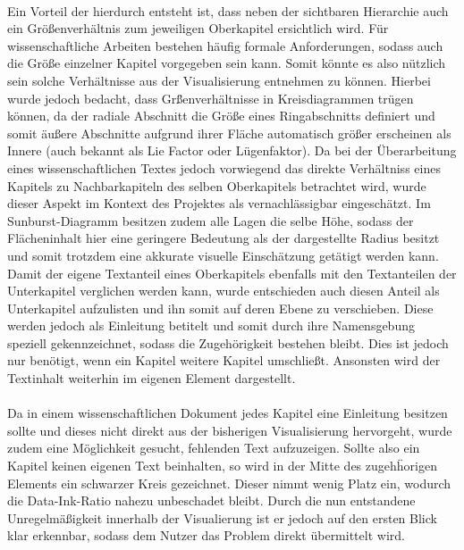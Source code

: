 \\
Ein Vorteil der hierdurch entsteht ist, dass neben der sichtbaren Hierarchie auch ein Gr\"o{\ss}enverh\"altnis zum jeweiligen Oberkapitel ersichtlich wird. F\"ur wissenschaftliche Arbeiten bestehen h\"aufig formale Anforderungen, sodass auch die Gr\"o{\ss}e einzelner Kapitel vorgegeben sein kann. Somit k\"onnte es also n\"utzlich sein solche Verh\"altnisse aus der Visualisierung entnehmen zu k\"onnen. Hierbei wurde jedoch bedacht, dass Gr\"{\ss}enverh\"altnisse in Kreisdiagrammen tr\"ugen k\"onnen, da der radiale Abschnitt die Gr\"o{\ss}e eines Ringabschnitts definiert und somit \"au{\ss}ere Abschnitte aufgrund ihrer Fl\"ache automatisch gr\"o{\ss}er erscheinen als Innere (auch bekannt als Lie Factor oder L\"ugenfaktor). Da bei der \"Uberarbeitung eines wissenschaftlichen Textes jedoch vorwiegend das direkte Verh\"altniss eines Kapitels zu Nachbarkapiteln des selben Oberkapitels betrachtet wird, wurde dieser Aspekt im Kontext des Projektes als vernachl\"assigbar eingesch\"atzt. Im Sunburst-Diagramm besitzen zudem alle Lagen die selbe H\"ohe, sodass der Fl\"acheninhalt hier eine geringere Bedeutung als der dargestellte Radius besitzt und somit trotzdem eine akkurate visuelle Einsch\"atzung get\"atigt werden kann. Damit der eigene Textanteil eines Oberkapitels ebenfalls mit den Textanteilen der Unterkapitel verglichen werden kann, wurde entschieden auch diesen Anteil als Unterkapitel aufzulisten und ihn somit auf deren Ebene zu verschieben. Diese werden jedoch als Einleitung betitelt und somit durch ihre Namensgebung speziell gekennzeichnet, sodass die Zugeh\"origkeit bestehen bleibt. Dies ist jedoch nur ben\"otigt, wenn ein Kapitel weitere Kapitel umschlie{\ss}t. Ansonsten wird der Textinhalt weiterhin im eigenen Element dargestellt.\\
\\
Da in einem wissenschaftlichen Dokument jedes Kapitel eine Einleitung besitzen sollte und dieses nicht direkt aus der bisherigen Visualisierung hervorgeht, wurde zudem eine M\"oglichkeit gesucht, fehlenden Text aufzuzeigen. Sollte also ein Kapitel keinen eigenen Text beinhalten, so wird in der Mitte des zugeh\"horigen Elements ein schwarzer Kreis gezeichnet. Dieser nimmt wenig Platz ein, wodurch die Data-Ink-Ratio nahezu unbeschadet bleibt. Durch die nun entstandene Unregelm\"a{\ss}igkeit innerhalb der Visualierung ist er jedoch auf den ersten Blick klar erkennbar, sodass dem Nutzer das Problem direkt \"ubermittelt wird.\\
\\
